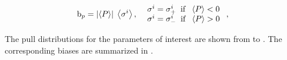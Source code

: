 \begin{equation}
{\rm b}_p = \left|\left<P\right>\right| \; \left<\sigma^i\right>,\;\; \left. 
  \begin{array}{ll}
    \sigma^i = \sigma^i_+ \;\;{\rm if}\;\; \left<P\right> < 0 \\
    \sigma^i = \sigma^i_- \;\;{\rm if}\;\; \left<P\right> > 0
  \end{array} \right. ,
\label{bias_def}
\end{equation}

The pull distributions for the parameters of interest are shown from  to .
The corresponding biases are summarized in .

\begin{figure}[!h]
  \centering
  \begin{subfigure}{0.5\textwidth}
    \scalebox{0.60}{}
    \caption{}
    \label{pull_ASMag2_bin1}
  \end{subfigure}%
  \hfill%
  \begin{subfigure}{0.5\textwidth}
    \scalebox{0.60}{}
    \caption{}
    \label{pull_ASPhase_bin1}
  \end{subfigure}
  \begin{subfigure}{0.5\textwidth}
    \scalebox{0.60}{}
    \caption{}
    \label{pull_ASMag2_bin2}
  \end{subfigure}%
  \hfill%
  \begin{subfigure}{0.5\textwidth}
    \scalebox{0.60}{}
    \caption{}
    \label{pull_ASPhase_bin2}
  \end{subfigure}
  \begin{subfigure}{0.5\textwidth}
    \scalebox{0.60}{}
    \caption{}
    \label{pull_ASMag2_bin2}
  \end{subfigure}%
  \hfill%
  \begin{subfigure}{0.5\textwidth}
    \scalebox{0.60}{}
    \caption{}
    \label{pull_ASPhase_bin3}
  \end{subfigure}
  \begin{subfigure}{0.5\textwidth}

\end{subfigure}
\end{figure}
